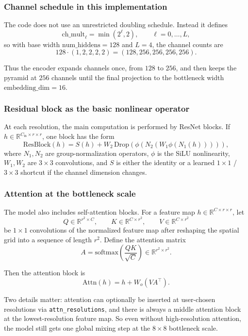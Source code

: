 \documentclass[11pt]{article}
\newcommand{\R}{\mathbb{R}}
\begin{document}
\subsubsection{Channel schedule in this implementation}

The code does not use an unrestricted doubling schedule. Instead it defines
\[
\mathrm{ch\_mult}_\ell = \min(2^\ell, 2), \qquad \ell = 0,\dots,L,
\]
so with base width $\mathrm{num\_hiddens} = 128$ and $L = 4$, the channel counts are
\[
128 \cdot (1,2,2,2,2) = (128,256,256,256,256).
\]

Thus the encoder expands channels once, from $128$ to $256$, and then keeps the pyramid at $256$ channels until the final projection to the bottleneck width $\mathrm{embedding\_dim} = 16$.

\subsubsection{Residual block as the basic nonlinear operator}

At each resolution, the main computation is performed by ResNet blocks. If $h \in \R^{C_{\mathrm{in}} \times r \times r}$, one block has the form
\[
\mathrm{ResBlock}(h)
=
S(h)
+
W_2 \,
\mathrm{Drop}\!\left(
\phi\!\left(
N_2\!\left(
W_1 \phi(N_1(h))
\right)
\right)
\right),
\]
where $N_1, N_2$ are group-normalization operators, $\phi$ is the SiLU nonlinearity, $W_1, W_2$ are $3 \times 3$ convolutions, and $S$ is either the identity or a learned $1 \times 1$ / $3 \times 3$ shortcut if the channel dimension changes.

\subsubsection{Attention at the bottleneck scale}

The model also includes self-attention blocks. For a feature map $h \in \R^{C \times r \times r}$, let
\[
Q \in \R^{r^2 \times C},
\qquad
K \in \R^{C \times r^2},
\qquad
V \in \R^{C \times r^2}
\]
be $1 \times 1$ convolutions of the normalized feature map after reshaping the spatial grid into a sequence of length $r^2$. Define the attention matrix
\[
A = \mathrm{softmax}\!\left(\frac{QK}{\sqrt{C}}\right) \in \R^{r^2 \times r^2}.
\]

Then the attention block is
\[
\mathrm{Attn}(h)
=
h
+
W_o (V A^\top).
\]

Two details matter: attention can optionally be inserted at user-chosen resolutions via \texttt{attn\_resolutions}, and there is always a middle attention block at the lowest-resolution feature map. So even without high-resolution attention, the model still gets one global mixing step at the $8 \times 8$ bottleneck scale.
\end{document}
